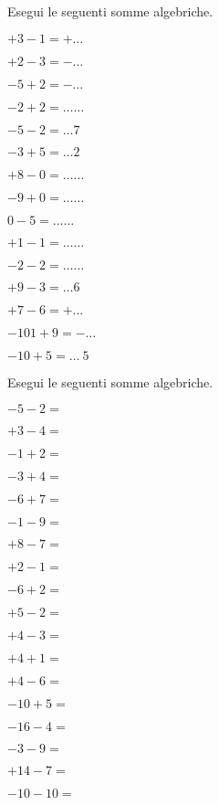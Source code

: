 \begin{esercizio}
Esegui le seguenti somme algebriche.
 \label{ese:2.14}
 \begin{multicols}{3}
 \begin{enumeratea}
 \item $+3 -1 = +\ldots$
 \item $+2 -3 = -\ldots$
 \item $-5 +2 = -\ldots$
 \item $-2 +2 = \ldots\ldots$
 \item $-5 -2 = \ldots7$
 \item $-3 +5 = \ldots2$
 \item $+8 -0 = \ldots\ldots$
 \item $-9 +0 = \ldots\ldots$
 \item $0 -5 = \ldots\ldots$
 \item $+1 -1 = \ldots\ldots$
 \item $-2 -2 = \ldots\ldots$
 \item $+9 -3 = \ldots6$
 \item $+7 -6 = +\ldots$
 \item $-101 +9 = -\ldots$
 \item $-10 +5 = \ldots~5$
 \end{enumeratea}
 \end{multicols}
\end{esercizio}

\begin{esercizio}
 \label{ese:2.15}
Esegui le seguenti somme algebriche.
\begin{multicols}{3}
 \begin{enumeratea}
 \item $-5 -2 =$
 \item $+3 -4 =$
 \item $-1 +2 =$
 \item $-3 +4 =$
 \item $-6 +7 =$
 \item $-1 -9 =$
 \item $+8 -7 =$
 \item $+2 -1 =$
 \item $-6 +2 =$
 \item $+5 -2 =$
 \item $+4 -3 =$
 \item $+4 +1 =$
 \item $+4 -6 =$
 \item $-10 +5 =$
 \item $-16 -4 =$
 \item $-3 -9 =$
 \item $+14 -7 =$
 \item $-10 -10 =$
 \end{enumeratea}

\end{multicols}

\end{esercizio}

